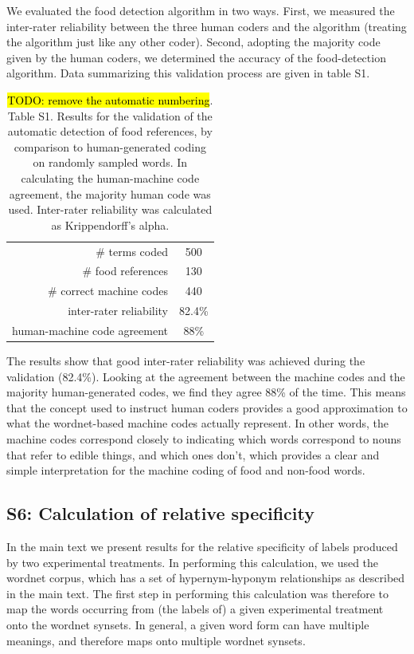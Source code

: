 \documentclass[12pt]{article}
\newcommand{\td}[1]{{\color{blu}\hl{TODO: #1}}}
\begin{document}
We evaluated the food detection algorithm in two ways.  First, we measured
the inter-rater reliability between the three human coders and the algorithm
(treating the algorithm just like any other coder).  Second, adopting the 
majority code given by the human coders, we determined the accuracy of the
food-detection algorithm.  Data summarizing this validation process are given
in table S1.

\begin{table}
\centering
\setlength{\tabcolsep}{12pt}
\begin{tabular}{ r | c }
\toprule    
\# terms coded & 500 \\
\# food references & 130 \\
\# correct machine codes & 440 \\
inter-rater reliability & 82.4\% \\
human-machine code agreement & 88\% \\
\bottomrule
\end{tabular}
\caption{\footnotesize{
	\td{remove the automatic numbering}. Table S1. Results for the validation 
	of the automatic detection of food references, by comparison to
	human-generated coding on randomly sampled words.  In calculating the 
	human-machine code agreement, the majority human code was used.
	Inter-rater reliability was calculated as Krippendorff's alpha.
}}
\end{table}

The results show that good inter-rater reliability was achieved during the
validation (82.4\%).  Looking at the agreement between the 
machine codes and the majority human-generated codes, we find they agree
88\% of the time.  This means that the concept used to instruct human coders
provides a good approximation to what the wordnet-based machine codes actually
represent. In other words, the machine codes correspond closely to indicating
which words correspond to nouns that refer to edible things, and which ones
don't, which provides a clear and simple interpretation for the machine
coding of food and non-food words.

\subsection*{S6: Calculation of relative specificity}
In the main text we present results for the relative specificity of labels
produced by two experimental treatments.  In performing this calculation,
we used the wordnet corpus, which has a set of hypernym-hyponym relationships
as described in the main text.  The first step in performing this calculation
was therefore to map the words occurring from (the labels of) a given 
experimental treatment onto the wordnet synsets.  In general, a given word
form can have multiple meanings, and therefore maps onto multiple wordnet 
synsets.
\end{document}

